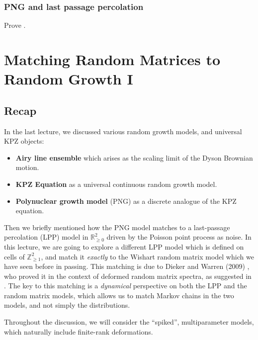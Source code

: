 \documentclass[letterpaper,11pt,oneside,reqno]{book}
\numberwithin{equation}{chapter}  %
\theoremstyle{definition}
\begin{document}
\subsection{PNG and last passage percolation}
\label{lecture12:prob:PNG_LPP}

Prove .













\chapter{Matching Random Matrices to Random Growth I}
\label{chap:lecture13}




\section{Recap}

In the last lecture, we discussed various random growth models, and universal KPZ objects:
\begin{itemize}
	\item \textbf{Airy line ensemble} which arises as the scaling limit of the Dyson Brownian motion.
	\item \textbf{KPZ Equation} as a universal continuous random growth model.
	\item \textbf{Polynuclear growth model} (PNG) as a discrete analogue of the KPZ equation.
\end{itemize}

Then we briefly mentioned how the PNG model matches to a
last-passage percolation (LPP) model in
$\mathbb{R}^2_{\ge0}$ driven by the Poisson
point process as noise.
In this lecture, we are going to explore a different
LPP model which is defined on cells of $\mathbb{Z}_{\ge1}^{2}$, and
match it \emph{exactly} to the Wishart random matrix model which we have seen before in passing.
This matching is due to Dieker and Warren (2009)
\cite{dieker2008largest}, who proved it
in the context
of deformed random matrix spectra,
as suggested in
\cite{BorodinPeche2009}.
The key to this matching is a \emph{dynamical} perspective
on both the LPP and the random matrix models, which allows us to
match Markov chains in the two models, and not simply the distributions.

Throughout the discussion, we will consider the ``spiked'', multiparameter models,
which naturally include finite-rank deformations.
\end{document}
